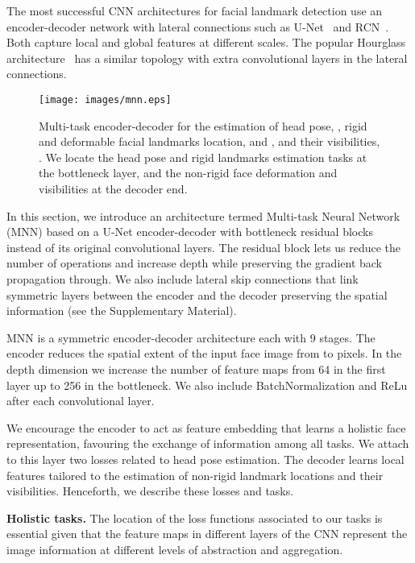 \documentclass[9pt,technote,compsoc]{IEEEtran}
\begin{document}
The most successful CNN architectures for facial landmark detection use an encoder-decoder network with lateral connections such as U-Net~\cite{Ronneberger15} and RCN~\cite{Honari16}. Both capture local and global features at different scales. The popular Hourglass architecture~\cite{Yang17} has a similar topology with extra convolutional layers in the lateral connections. 

\begin{figure}
\centering
\texttt{[image: images/mnn.eps]}
\caption{Multi-task encoder-decoder for the estimation of head pose, , rigid and deformable facial landmarks location,  and  , and their visibilities, . We locate the head pose and rigid landmarks estimation tasks at the bottleneck layer, and the non-rigid face deformation and visibilities at the decoder end.}
\label{fig:multitask}
\end{figure}

In this section, we introduce an architecture termed Multi-task Neural Network (MNN) based on a U-Net encoder-decoder with bottleneck residual blocks~\cite{He16b} instead of its original convolutional layers. The residual block lets us reduce the number of operations and increase depth while preserving the gradient back propagation through. We also include lateral skip connections that link symmetric layers between the encoder and the decoder preserving the spatial information (see the Supplementary Material). 

MNN is a symmetric encoder-decoder architecture each with 9 stages. The encoder reduces the spatial extent of the input face image from  to  pixels. In the depth dimension we increase the number of feature maps from 64 in the first layer up to 256 in the bottleneck. We also include BatchNormalization and ReLu after each convolutional layer.

We encourage the encoder to act as feature embedding that learns a holistic face representation, favouring the exchange of information among all tasks. We attach to this layer two losses related to head pose estimation. The decoder learns local features tailored to the estimation of non-rigid landmark locations and their visibilities. Henceforth, we describe these losses and tasks.

\textbf{Holistic tasks.} 
The location of the loss functions associated to our tasks is essential given that the feature maps in different layers of the CNN represent the image information at different levels of abstraction and aggregation.
\end{document}
